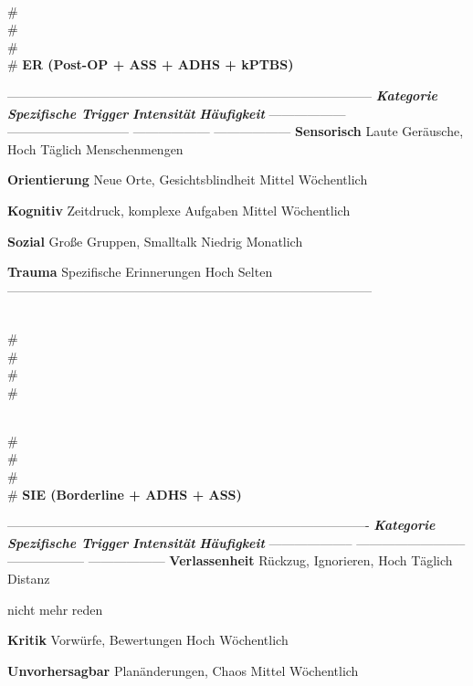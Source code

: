 \\#\\#\\#\\# \textbf{ER (Post-OP + ASS + \textcolor{ctmmOrange}{ADHS} + kPTBS)}

--------------------------------------------------------------------------------------
\textbf{\textit{Kategorie}}    \textbf{\textit{Spezifische \textcolor{ctmmRed}{Trigger}}}     \textbf{\textit{Intensität}}   \textbf{\textit{Häufigkeit}}
------------------ ----------------------------- ------------------ ------------------
\textbf{Sensorisch}     Laute Geräusche,              Hoch               Täglich
Menschenmengen

\textbf{Orientierung}   Neue Orte, Gesichtsblindheit  Mittel             Wöchentlich

\textbf{Kognitiv}       Zeitdruck, komplexe Aufgaben  Mittel             Wöchentlich

\textbf{Sozial}         Große Gruppen, Smalltalk      Niedrig            Monatlich

\textbf{Trauma}         Spezifische Erinnerungen      Hoch               Selten
--------------------------------------------------------------------------------------

\\#\\#\\#\\#

\\#\\#\\#\\# \textbf{SIE (\textcolor{ctmmPurple}{Borderline} + \textcolor{ctmmOrange}{ADHS} + ASS)}

-------------------------------------------------------------------------------------
\textbf{\textit{Kategorie}}      \textbf{\textit{Spezifische \textcolor{ctmmRed}{Trigger}}}  \textbf{\textit{Intensität}}   \textbf{\textit{Häufigkeit}}
-------------------- -------------------------- ------------------ ------------------
\textbf{Verlassenheit}    Rückzug, Ignorieren,       Hoch               Täglich
Distanz

nicht mehr reden

\textbf{Kritik}           Vorwürfe, Bewertungen      Hoch               Wöchentlich

\textbf{Unvorhersagbar}   Planänderungen, Chaos      Mittel             Wöchentlich

